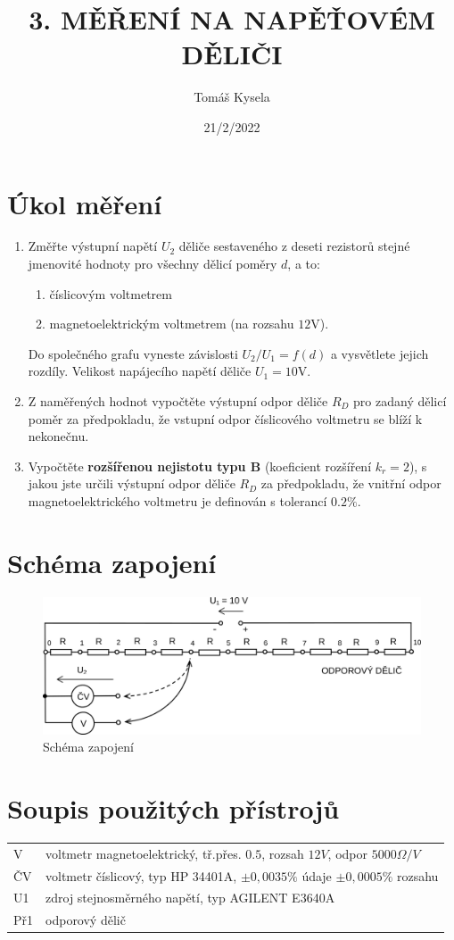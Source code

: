 \documentclass{article}
\title{\textbf{3. MĚŘENÍ NA NAPĚŤOVÉM DĚLIČI}}
\author{Tomáš Kysela}
\date{21/2/2022}
\begin{document}
\maketitle

\section{Úkol měření}
\begin{enumerate}
	\item Změřte výstupní napětí $U_2$ děliče sestaveného z deseti rezistorů stejné jmenovité hodnoty pro všechny dělicí poměry $d$, a to:
	      \begin{enumerate}
		      \item číslicovým voltmetrem
		      \item magnetoelektrickým voltmetrem (na rozsahu $12 \si{\volt}$).
	      \end{enumerate}
	      Do společného grafu vyneste závislosti $U_2 /U_1 = f(d)$ a vysvětlete jejich rozdíly. Velikost napájecího napětí děliče $U_1 = 10 \si{\volt}$.

	\item Z naměřených hodnot vypočtěte výstupní odpor děliče $R_D$ pro zadaný dělicí poměr za předpokladu, že vstupní odpor číslicového voltmetru se blíží k nekonečnu.

	\item Vypočtěte \textbf{rozšířenou nejistotu typu B} (koeficient rozšíření $k_r = 2$), s jakou jste určili výstupní odpor děliče $R_D$ za předpokladu, že vnitřní odpor magnetoelektrického voltmetru je definován s tolerancí $0.2\%$.
\end{enumerate}
\section{Schéma zapojení}
\begin{figure}[htp]
	\centering
	\includegraphics[scale=1.00]{LAB3.png}
	\caption{Schéma zapojení}
\end{figure}
\section{Soupis použitých přístrojů}
\begin{tabular}{ll}
	V   & voltmetr magnetoelektrický, tř.přes. $0.5$, rozsah $12 V$, odpor $5000 \Omega/V$ \\
	ČV  & voltmetr číslicový, typ HP 34401A, $\pm 0,0035 \%$ údaje $\pm 0,0005 \%$ rozsahu \\
	U1  & zdroj stejnosměrného napětí, typ AGILENT E3640A                                  \\
	Př1 & odporový dělič
\end{tabular}
\end{document}
